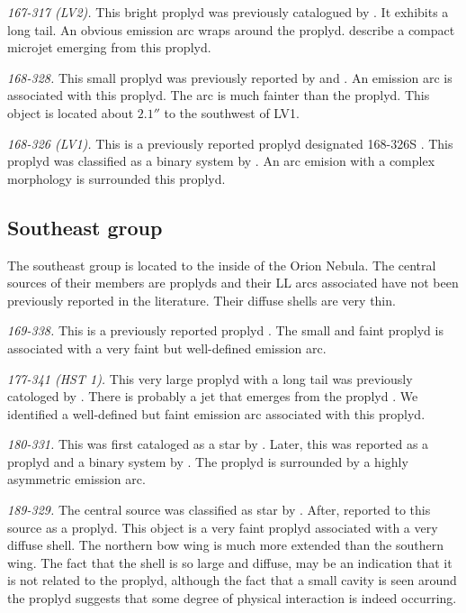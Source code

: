 \documentclass[iop, apj]{emulateapj}
\renewcommand\clearpage{}
\begin{document}
\textit{167-317 (LV2).} This bright proplyd was previously catalogued by \citet{ODell:1994a, Ricci:2008a}. It exhibits a long tail. An obvious emission arc \citep{Bally:2000a} wraps around the proplyd. \citet{Bally:2000a} describe a compact microjet emerging from this proplyd. 

\textit{168-328.} This small proplyd was previously reported by \citet{ODell:1994a} and \citet{Ricci:2008a}. An emission arc is associated with this proplyd. The arc is much fainter than the proplyd. This object is located about \(2.1''\) to the southwest of LV1.  

\textit{168-326 (LV1).} This is a previously reported proplyd  designated 168-326S \citep{ODell:1994a}. This proplyd was classified as a binary system by \citet{Ricci:2008a}. An arc emision with a complex morphology is surrounded this proplyd.


\clearpage
\subsection{Southeast group}
\label{sec:se-group}



The southeast group is located to the inside of the Orion Nebula. The central sources of their members are proplyds and their LL arcs associated have not been previously reported in the literature. Their diffuse shells are very thin. 

\textit{169-338.} This is a previously reported proplyd \citep{ODell:1994a, Ricci:2008a}. The small and faint proplyd is associated with a very faint but well-defined emission arc. 

\textit{177-341 (HST 1).} This very large proplyd with a long tail was
previously catologed by \citet{ODell:1994a, Ricci:2008a}. There is probably a jet that emerges from the proplyd \citep{Bally:2000a}. We identified a well-defined but faint  emission arc associated with this proplyd.

\textit{180-331.} This was first cataloged as a star by \citet{ODell:1996a}. Later, this was reported as a proplyd and a binary system by \citet{Ricci:2008a}. The proplyd is surrounded by a highly asymmetric emission arc.

\textit{189-329.} The central source was classified as star by \citet{ODell:1996a}. After, \citet{Ricci:2008a} reported to this source as a proplyd. This object is a very faint proplyd associated with a very diffuse shell. The northern bow wing is much more extended than the southern wing. The fact that the shell is so large and diffuse, may be an indication that it is not related to the proplyd, although the fact that a small cavity is seen  around the proplyd suggests that some degree of physical interaction is indeed occurring.
\end{document}

